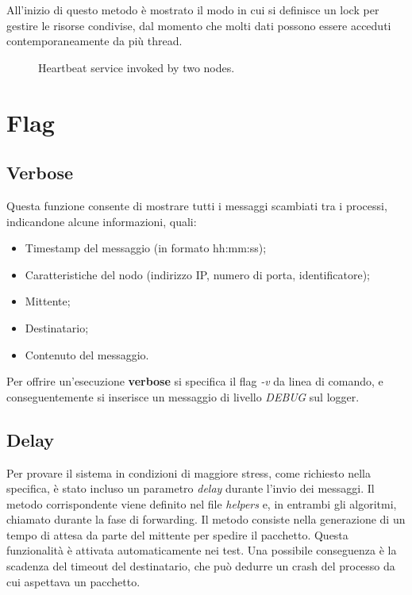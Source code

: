 \documentclass[conference]{IEEEtran}
\begin{document}
All'inizio di questo metodo è mostrato il modo in cui si definisce un lock per gestire le risorse condivise, dal momento che molti dati possono essere acceduti contemporaneamente da più thread.

\begin{figure}[htbp]
  \centering
  
  \caption{Heartbeat service invoked by two nodes.}
\end{figure}


\section{Flag}\label{sec:flag}


\subsection{Verbose}\label{verbose}

Questa funzione consente di mostrare tutti i messaggi scambiati tra i processi, indicandone alcune informazioni, quali:
\begin{itemize}
	\item Timestamp del messaggio (in formato hh:mm:ss);
	\item Caratteristiche del nodo (indirizzo IP, numero di porta, identificatore);
	\item Mittente;
	\item Destinatario;
	\item Contenuto del messaggio.
\end{itemize}
Per offrire un'esecuzione \textbf{verbose} si specifica il flag \textit{-v} da linea di comando, e conseguentemente si inserisce un messaggio di livello \textit{DEBUG} sul logger.


\subsection{Delay}\label{delay}

Per provare il sistema in condizioni di maggiore stress, come richiesto nella specifica, è stato incluso un parametro \textit{delay} durante l'invio dei messaggi.
Il metodo corrispondente viene definito nel file \textit{helpers} e, in entrambi gli algoritmi, chiamato durante la fase di forwarding.
Il metodo consiste nella generazione di un tempo di attesa da parte del mittente per spedire il pacchetto.
Questa funzionalità è attivata automaticamente nei test.
Una possibile conseguenza è la scadenza del timeout del destinatario, che può dedurre un crash del processo da cui aspettava un pacchetto.
\end{document}
